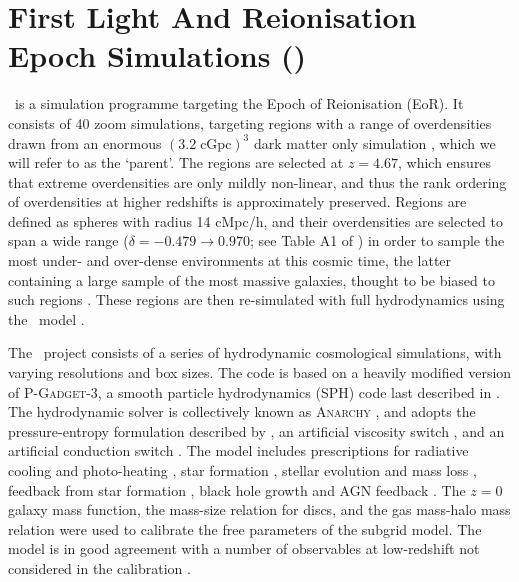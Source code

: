 \section{First Light And Reionisation Epoch Simulations (\flares)}
\label{sec:flares}

\flares\ is a simulation programme targeting the Epoch of Reionisation (EoR).
It consists of 40 zoom simulations, targeting regions with a range of overdensities drawn from an enormous $(3.2\; \mathrm{cGpc})^{3}$ dark matter only simulation  \citep{barnes_redshift_2017}, which we will refer to as the `parent'.
The regions are selected at $z = 4.67$, which ensures that extreme overdensities are only mildly non-linear, and thus the rank ordering of overdensities at higher redshifts is approximately preserved.  
Regions are defined as spheres with radius 14 cMpc/h, and their overdensities are selected to span a wide range ($\delta=-0.479\to0.970$; see Table A1 of \citealt{Lovell2021}) in order to sample the most under- and over-dense environments at this cosmic time, the latter containing a large sample of the most massive galaxies, thought to be biased to such regions  \citep{chiang_ancient_2013,lovell_characterising_2018}.
These regions are then re-simulated with full hydrodynamics using the \eagle\ model \citep{schaye_eagle_2015,crain_eagle_2015}.

The \eagle\ project consists of a series of hydrodynamic cosmological simulations, with varying resolutions and box sizes.
The code is based on a heavily modified version of \textsc{P-Gadget-3}, a smooth particle hydrodynamics (SPH) code last described in \cite{springel_simulations_2005}.
The hydrodynamic solver is collectively known as \textsc{Anarchy} \citep[described in][]{schaye_eagle_2015,Schaller2015}, and adopts the pressure-entropy formulation described by \cite{Hopkins2013}, an artificial viscosity switch \citep{cullen_inviscid_2010}, and an artificial conduction switch \citep[e.g.][]{price_modelling_2008}. 
The model includes prescriptions for radiative cooling and photo-heating \citep{Wiersma2009a}, star formation \citep{Schaye2008}, stellar evolution and mass loss \citep{Wiersma2009b}, feedback from star formation \citep{DallaVecchia2012}, black hole growth and AGN feedback \citep{springel_blackhole_2005,B_and_S2009,Rosas-Guevara2015}. 
The $z=0$ galaxy mass function, the mass-size relation for discs, and the gas mass-halo mass relation were used to calibrate the free parameters of the subgrid model. 
The model is in good agreement with a number of observables at low-redshift not considered in the calibration \citep[e.g.][]{furlong_evolution_2015,Trayford2015,Lagos2015}. 

